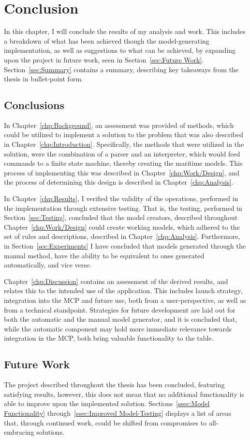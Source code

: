 \chapter{Conclusion}
In this chapter, I will conclude the results of my analysis and work. This includes a breakdown of what has been achieved though the model-generating implementation, as well as suggestions to what can be achieved, by expanding upon the project in future work, seen in Section~\ref{sec:Future Work}. Section~\ref{sec:Summary} contains a summary, describing key takeaways from the thesis in bullet-point form.
\section{Conclusions}
In Chapter~\ref{chp:Background}, an assessment was provided of methods, which could be utilized to implement a solution to the problem that was also described in Chapter~\ref{chp:Introduction}. Specifically, the methods that were utilized in the solution, were the combination of a parser and an interpreter, which would feed commands to a finite state machine, thereby creating the maritime models. This process of implementing this was described in Chapter~\ref{chp:Work/Design}, and the process of determining this design is described in Chapter~\ref{chp:Analysis}.

In Chapter~\ref{chp:Results}, I verified the validity of the operations, performed in the implementation through extensive testing. That is, the testing, performed in Section~\ref{sec:Testing}, concluded that the model creators, described throughout Chapter~\ref{chp:Work/Design} could create working models, which adhered to the set of rules and descriptions, described in Chapter~\ref{chp:Analysis}. Furthermore, in Section~\ref{sec:Experiments} I have concluded that models generated through the manual method, have the ability to be equivalent to ones generated automatically, and vice verse.

Chapter~\ref{chp:Discussion} contains an assessment of the derived results, and relates this to the intended use of the application. This includes launch strategy, integration into the MCP and future use, both from a user-perspective, as well as from a technical standpoint. Strategies for future development are laid out for both the automatic and the manual model generator, and it is concluded that, while the automatic component may hold more immediate relevance towards integration in the MCP, both bring valuable functionality to the table.
\section{Future Work}
The project described throughout the thesis has been concluded, featuring satisfying results, however, this does not mean that no additional functionality is able to improve upon the implemented solution. Sections~\ref{ssec:Model Functionality} through~\ref{ssec:Improved Model-Testing} displays a list of areas that, through continued work, could be shifted from compromises to all-embracing solutions.
